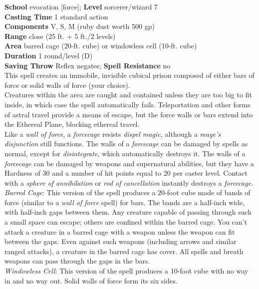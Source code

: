 \textbf{School }evocation [force]; \textbf{Level }sorcerer/wizard 7\\
\textbf{Casting Time }1 standard action\\
\textbf{Components }V, S, M (ruby dust worth 500 gp)\\
\textbf{Range }close (25 ft. + 5 ft./2 levels)\\
\textbf{Area }barred cage (20-ft. cube) or windowless cell (10-ft. cube)\\
\textbf{Duration }1 round/level (D)\\
\textbf{Saving Throw }Reflex negates; \textbf{Spell Resistance }no\\
This spell creates an immobile, invisible cubical prison composed of either bars of force or solid walls of force (your choice).\\
Creatures within the area are caught and contained unless they are too big to fit inside, in which case the spell automatically fails. Teleportation and other forms of astral travel provide a means of escape, but the force walls or bars extend into the Ethereal Plane, blocking ethereal travel.\\
Like a \textit{wall of force}, a \textit{forcecage} resists \textit{dispel magic, }although a \textit{mage's disjunction} still functions\textit{. }The walls of a \textit{forcecage }can be damaged by spells as normal, except for \textit{disintegrate, }which automatically destroys it. The walls of a \textit{forcecage} can be damaged by weapons and supernatural abilities, but they have a Hardness of 30 and a number of hit points equal to 20 per caster level. Contact with a \textit{sphere of annihilation }or \textit{rod of cancellation} instantly destroys a \textit{forcecage.}\\
\textit{Barred Cage}: This version of the spell produces a 20-foot cube made of bands of force (similar to a \textit{wall of force }spell) for bars. The bands are a half-inch wide, with half-inch gaps between them. Any creature capable of passing through such a small space can escape; others are confined within the barred cage. You can't attack a creature in a barred cage with a weapon unless the weapon can fit between the gaps. Even against such weapons (including arrows and similar ranged attacks), a creature in the barred cage has cover. All spells and breath weapons can pass through the gaps in the bars.\\
\textit{Windowless Cell}: This version of the spell produces a 10-foot cube with no way in and no way out. Solid walls of force form its six sides.\\
